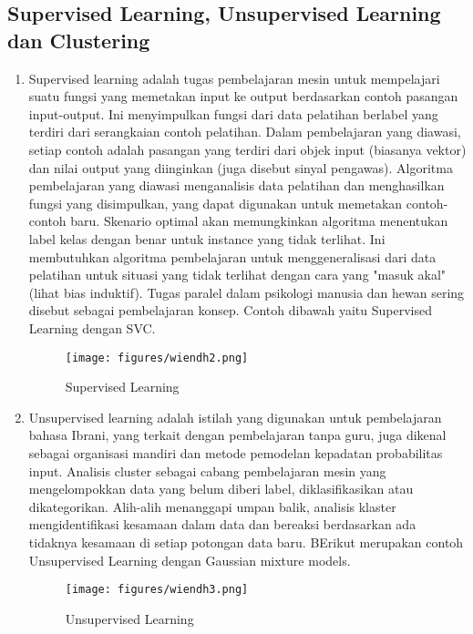 \subsection{Supervised Learning, Unsupervised Learning dan Clustering }
\begin{enumerate}
\item Supervised learning adalah tugas pembelajaran mesin untuk mempelajari suatu fungsi yang memetakan input ke output berdasarkan contoh pasangan input-output. Ini menyimpulkan fungsi dari data pelatihan berlabel yang terdiri dari serangkaian contoh pelatihan. Dalam pembelajaran yang diawasi, setiap contoh adalah pasangan yang terdiri dari objek input (biasanya vektor) dan nilai output yang diinginkan (juga disebut sinyal pengawas). Algoritma pembelajaran yang diawasi menganalisis data pelatihan dan menghasilkan fungsi yang disimpulkan, yang dapat digunakan untuk memetakan contoh-contoh baru. Skenario optimal akan memungkinkan algoritma menentukan label kelas dengan benar untuk instance yang tidak terlihat. Ini membutuhkan algoritma pembelajaran untuk menggeneralisasi dari data pelatihan untuk situasi yang tidak terlihat dengan cara yang "masuk akal" (lihat bias induktif). Tugas paralel dalam psikologi manusia dan hewan sering disebut sebagai pembelajaran konsep. Contoh dibawah yaitu Supervised Learning dengan SVC.
\begin{figure}[ht]
\centering
\texttt{[image: figures/wiendh2.png]}
\caption{Supervised Learning}
\label{contoh}
\end{figure}
\item Unsupervised learning adalah istilah yang digunakan untuk pembelajaran bahasa Ibrani, yang terkait dengan pembelajaran tanpa guru, juga dikenal sebagai organisasi mandiri dan metode pemodelan kepadatan probabilitas input. Analisis cluster sebagai cabang pembelajaran mesin yang mengelompokkan data yang belum diberi label, diklasifikasikan atau dikategorikan. Alih-alih menanggapi umpan balik, analisis klaster mengidentifikasi kesamaan dalam data dan bereaksi berdasarkan ada tidaknya kesamaan di setiap potongan data baru. BErikut merupakan contoh Unsupervised Learning dengan Gaussian mixture models.
\begin{figure}[ht]
\centering
\texttt{[image: figures/wiendh3.png]}
\caption{Unsupervised Learning}
\label{contoh}
\end{figure}

\end{enumerate}
